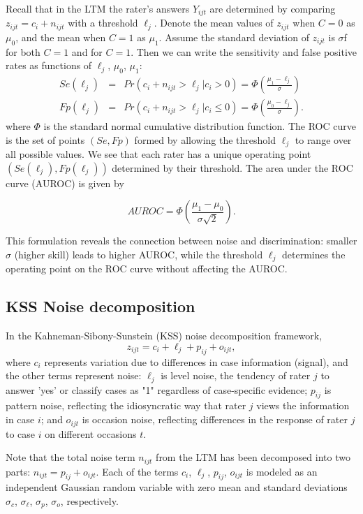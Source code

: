 Recall that in the LTM the rater's answers $Y_{ijt}$ are determined by comparing $z_{ijt} = c_i + n_{ijt}$ with a threshold $\ell_j$. Denote the mean values of $z_{ijt}$ when $C=0$ as $\mu_0$, and the mean when $C=1$ as $\mu_1$. Assume the standard deviation of $z_{ijt}$ is $\sigma$f for both $C=1$ and for $C=1$. Then we can write the sensitivity and false positive rates as functions of $\ell_j$, $\mu_0$, $\mu_1$:
\begin{eqnarray*}
    Se(\ell_j) &=& Pr(c_{i}+n_{ijt}>\ell_j|c_{i}>0) = \Phi\left(\frac{\mu_1-\ell_j}{\sigma}\right)\\
    Fp(\ell_j) &=& Pr(c_{i}+n_{ijt}>\ell_j|c_i \leq 0) = \Phi\left(\frac{\mu_0-\ell_j}{\sigma}\right).
\end{eqnarray*}
where $\Phi$ is the standard normal cumulative distribution function. The ROC curve is the set of points $(Se, Fp)$ formed by allowing the threshold $\ell_j$ to range over all possible values. We see that each rater has a unique operating point $(Se(\ell_j), Fp(\ell_j))$ determined by their threshold. The area under the ROC curve (AUROC) is given by

$$AUROC = \Phi\left(\frac{\mu_1-\mu_0}{\sigma \sqrt{2}}\right).$$

This formulation reveals the connection between noise and discrimination: smaller $\sigma$ (higher skill) leads to higher AUROC, while the threshold $\ell_j$ determines the operating point on the ROC curve without affecting the AUROC.

\subsection*{KSS Noise decomposition}\label{section-KSS}
In the Kahneman-Sibony-Sunstein (KSS) noise decomposition framework, $$z_{ijt} = c_i + \ell_j + p_{ij} + o_{ijt},$$
where $c_i$ represents variation due to differences in case information (signal), and the other terms represent noise: $\ell_j$ is level noise, the tendency of rater $j$ to answer 'yes' or classify cases as "1" regardless of case-specific evidence; $p_{ij}$ is pattern noise, reflecting the idiosyncratic way that rater $j$ views the information in case $i$; and $o_{ijt}$ is occasion noise, reflecting differences in the response of rater $j$ to case $i$ on different occasions $t$.

Note that the total noise term $n_{ijt}$ from the LTM has been decomposed into two parts: $n_{ijt} = p_{ij} + o_{ijt}$. Each of the terms $c_i$, $\ell_j$, $p_{ij}$, $o_{ijt}$ is modeled as an independent Gaussian random variable with zero mean and standard deviations $\sigma_c$, $\sigma_\ell$, $\sigma_p$, $\sigma_o$, respectively. 

